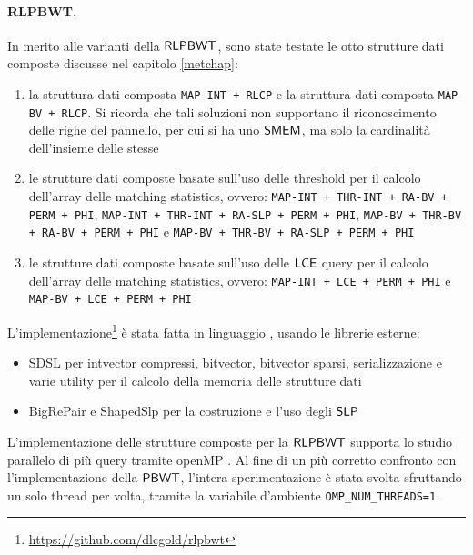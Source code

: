 \paragraph{RLPBWT.}
In merito alle varianti della $\mbox{\rm {\sf RLPBWT}}$, sono state testate le otto
strutture dati composte discusse nel capitolo \ref{metchap}:
\begin{enumerate}
  \item la struttura dati composta \texttt{MAP-INT + RLCP} e la struttura dati
  composta \texttt{MAP-BV + RLCP}. Si ricorda che tali soluzioni non supportano
  il riconoscimento delle righe del pannello, per cui si ha uno $\mbox{\rm {\sf SMEM}}$, ma
  solo la cardinalità dell'insieme delle stesse
  \item le strutture dati composte basate sull'uso delle threshold per
  il calcolo dell'array delle matching statistics, 
  ovvero: \texttt{MAP-INT + THR-INT + RA-BV + PERM + PHI},  \texttt{MAP-INT +
    THR-INT + RA-SLP + PERM + PHI}, \texttt{MAP-BV + THR-BV + RA-BV + PERM +
    PHI} e \texttt{MAP-BV + THR-BV + RA-SLP + PERM + PHI} 
  \item le strutture dati composte basate sull'uso delle $\mbox{\rm {\sf LCE}}$ query
  per
  il calcolo dell'array delle matching statistics,
  ovvero: \texttt{MAP-INT + LCE + PERM + PHI} e \texttt{MAP-BV + LCE + PERM +
    PHI}  
\end{enumerate}
L'implementazione\footnote{\url{https://github.com/dlcgold/rlpbwt}} è stata
fatta in linguaggio \Cplusplus, usando le
librerie esterne:
\begin{itemize}
  \item SDSL per intvector compressi,
  bitvector, bitvector sparsi, serializzazione e varie utility
  per il calcolo della memoria delle strutture dati
  \item BigRePair e ShapedSlp per la costruzione e l'uso degli $\mbox{\rm {\sf SLP}}$ 
\end{itemize}
L'implementazione delle strutture composte per la
$\mbox{\rm {\sf RLPBWT}}$ supporta lo studio parallelo di più query tramite
openMP \cite{openmp}. Al fine di un più 
corretto confronto con l'implementazione della $\mbox{\rm {\sf PBWT}}$,
l'intera sperimentazione è stata
svolta sfruttando un solo thread per volta, tramite la variabile
d'ambiente \texttt{OMP\_NUM\_THREADS=1}.
